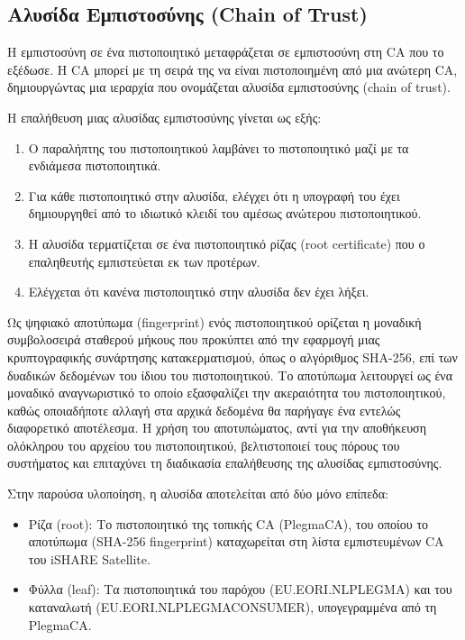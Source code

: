 \subsection{Αλυσίδα Εμπιστοσύνης (\textlatin{Chain of Trust})}
\label{subsec:trust-chain}

Η εμπιστοσύνη σε ένα πιστοποιητικό μεταφράζεται σε εμπιστοσύνη στη
\textlatin{CA} που το εξέδωσε. Η \textlatin{CA} μπορεί με τη σειρά της
να είναι πιστοποιημένη από μια ανώτερη \textlatin{CA}, δημιουργώντας μια
ιεραρχία που ονομάζεται αλυσίδα εμπιστοσύνης (\textlatin{chain of trust}).

Η επαλήθευση μιας αλυσίδας εμπιστοσύνης γίνεται ως εξής:
\begin{enumerate}
    \item Ο παραλήπτης του πιστοποιητικού λαμβάνει το πιστοποιητικό μαζί με τα ενδιάμεσα πιστοποιητικά.
    \item Για κάθε πιστοποιητικό στην αλυσίδα, ελέγχει ότι η υπογραφή
    του έχει δημιουργηθεί από το ιδιωτικό κλειδί του αμέσως ανώτερου
    πιστοποιητικού.
    \item Η αλυσίδα τερματίζεται σε ένα πιστοποιητικό ρίζας
    (\textlatin{root certificate}) που ο επαληθευτής εμπιστεύεται εκ
    των προτέρων.
    \item Ελέγχεται ότι κανένα πιστοποιητικό στην αλυσίδα δεν έχει λήξει.
\end{enumerate}

Ως ψηφιακό αποτύπωμα (\textlatin{fingerprint}) ενός πιστοποιητικού ορίζεται 
η μοναδική συμβολοσειρά σταθερού μήκους που προκύπτει από την εφαρμογή μιας 
κρυπτογραφικής συνάρτησης κατακερματισμού, 
όπως ο αλγόριθμος \textlatin{SHA-256}, επί των δυαδικών δεδομένων του ίδιου 
του πιστοποιητικού. Το αποτύπωμα λειτουργεί ως ένα μοναδικό 
αναγνωριστικό το οποίο εξασφαλίζει την ακεραιότητα του πιστοποιητικού, καθώς 
οποιαδήποτε αλλαγή στα αρχικά δεδομένα θα παρήγαγε ένα εντελώς διαφορετικό 
αποτέλεσμα. Η χρήση του αποτυπώματος, αντί για την αποθήκευση ολόκληρου του αρχείου του πιστοποιητικού, 
βελτιστοποιεί τους πόρους του συστήματος και επιταχύνει τη διαδικασία 
επαλήθευσης της αλυσίδας εμπιστοσύνης.

Στην παρούσα υλοποίηση, η αλυσίδα αποτελείται από δύο μόνο επίπεδα:
\begin{itemize}
    \item Ρίζα (\textlatin{root}): Το πιστοποιητικό της τοπικής
    \textlatin{CA} (\textlatin{PlegmaCA}), του οποίου το αποτύπωμα
    (\textlatin{SHA-256 fingerprint}) καταχωρείται στη λίστα εμπιστευμένων
    \textlatin{CA} του \textlatin{iSHARE Satellite}.
    \item Φύλλα (\textlatin{leaf}): Τα πιστοποιητικά του παρόχου
    (\textlatin{EU.EORI.NLPLEGMA}) και του καταναλωτή
    (\textlatin{EU.EORI.NLPLEGMACONSUMER}), υπογεγραμμένα από τη
    \textlatin{PlegmaCA}.
\end{itemize}

